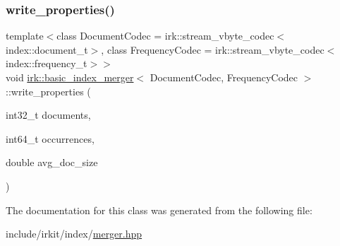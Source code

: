 \mbox{\label{classirk_1_1basic__index__merger_a4264e90f9176de1b6afa731e670df8af}} 
\subsubsection{\texorpdfstring{write\+\_\+properties()}{write\_properties()}}
{\footnotesize\ttfamily template$<$class Document\+Codec  = irk\+::stream\+\_\+vbyte\+\_\+codec$<$index\+::document\+\_\+t$>$, class Frequency\+Codec  = irk\+::stream\+\_\+vbyte\+\_\+codec$<$index\+::frequency\+\_\+t$>$$>$ \\
void \mbox{\hyperlink{classirk_1_1basic__index__merger}{irk\+::basic\+\_\+index\+\_\+merger}}$<$ Document\+Codec, Frequency\+Codec $>$\+::write\+\_\+properties (\begin{DoxyParamCaption}\item[{int32\+\_\+t}]{documents,  }\item[{int64\+\_\+t}]{occurrences,  }\item[{double}]{avg\+\_\+doc\+\_\+size }\end{DoxyParamCaption})\hspace{0.3cm}{\ttfamily [inline]}}



The documentation for this class was generated from the following file\+:\begin{DoxyCompactItemize}
\item 
include/irkit/index/\mbox{\hyperlink{merger_8hpp}{merger.\+hpp}}\end{DoxyCompactItemize}
